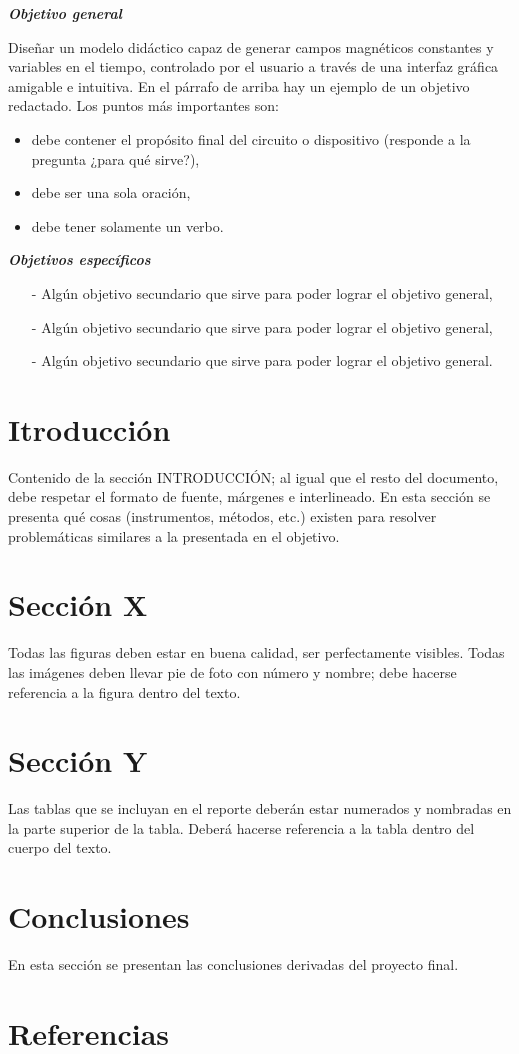 \documentclass[letterpaper, 12pt]{article}
\begin{document}
\textit{ \textbf{Objetivo general}}

Diseñar un modelo didáctico capaz de generar campos magnéticos constantes y variables en el tiempo, controlado por el usuario a través de una interfaz gráfica amigable e intuitiva.
En el párrafo de arriba hay un ejemplo de un objetivo redactado. Los puntos más importantes son: 

\begin{itemize}

    \item debe contener el propósito final del circuito o dispositivo (responde a la pregunta ¿para qué sirve?),
    \item debe ser una sola oración,
    \item debe tener solamente un verbo.
    \end{itemize}

\textit{ \textbf{Objetivos específicos}}
\begin{itemize}

    \item[-] Algún objetivo secundario que sirve para poder lograr el objetivo general,
    \item[-] Algún objetivo secundario que sirve para poder lograr el objetivo general,
    \item[-] Algún objetivo secundario que sirve para poder lograr el objetivo general.
    \end{itemize}

\section{Itroducción}
Contenido de la sección INTRODUCCIÓN; al igual que el resto del documento, debe respetar el formato de fuente, márgenes e interlineado. En esta sección se presenta qué cosas (instrumentos, métodos, etc.) existen para resolver problemáticas similares a la presentada en el objetivo.

\section{Sección X}
Todas las figuras deben estar en buena calidad, ser perfectamente visibles. Todas las imágenes deben llevar pie de foto con número y nombre; debe hacerse referencia a la figura dentro del texto.

\section{Sección Y}
Las tablas que se incluyan en el reporte deberán estar numerados y nombradas en la parte superior de la tabla.  Deberá hacerse referencia a la tabla dentro del cuerpo del texto.

\section{Conclusiones}
En esta sección se presentan las conclusiones derivadas del proyecto final.

\section{Referencias}


\end{document}
